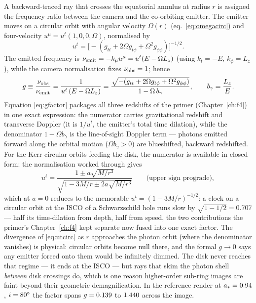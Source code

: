 A backward-traced ray that crosses the equatorial annulus at radius $r$
is assigned the frequency ratio between the camera and the co-orbiting
emitter. The emitter moves on a circular orbit with angular velocity
$\Omega(r)$ (eq.~\ref{eq:omegacirc}) and four-velocity
$u^\mu = u^t(1, 0, 0, \Omega)$, normalised by
\begin{equation}
u^t = \bigl[-(g_{tt} + 2\Omega g_{t\phi}
+ \Omega^2 g_{\phi\phi})\bigr]^{-1/2}.
\end{equation}
The emitted frequency is $\nu_{\rm emit} = -k_\mu u^\mu
= u^t (E - \Omega L_z)$ (using $k_t = -E$, $k_\phi = L_z$), while the
camera normalisation fixes $\nu_{\rm obs} = 1$; hence
\begin{equation}
g \equiv \frac{\nu_{\rm obs}}{\nu_{\rm emit}}
      = \frac{1}{u^t\,(E - \Omega L_z)}
      = \frac{\sqrt{-(g_{tt} + 2\Omega g_{t\phi} + \Omega^2
        g_{\phi\phi})}}{1 - \Omega\,b_\gamma},
\qquad b_\gamma = \frac{L_z}{E}.
\label{eq:gfactor}
\end{equation}
Equation \eqref{eq:gfactor} packages all three redshifts of the primer
(Chapter~\ref{ch:f4}) in one exact expression: the numerator carries
gravitational redshift and transverse Doppler (it is $1/u^t$, the
emitter's total time dilation), while the denominator
$1 - \Omega b_\gamma$ is the line-of-sight Doppler term — photons
emitted forward along the orbital motion ($\Omega b_\gamma > 0$) are
blueshifted, backward redshifted. For the Kerr circular orbits feeding
the disk, the numerator is available in closed form: the normalisation
worked through \citet{BardeenPressTeukolsky1972} gives
\begin{equation}
u^t =
\frac{1 \pm a\sqrt{M/r^3}}{\sqrt{1 - 3M/r \pm 2a\sqrt{M/r^3}}}
\qquad\text{(upper sign prograde)},
\label{eq:utcirc}
\end{equation}
which at $a = 0$ reduces to the memorable
$u^t = (1 - 3M/r)^{-1/2}$: a clock on a circular orbit at the ISCO of
a Schwarzschild hole runs slow by $\sqrt{1 - 1/2} = 0.707$ — half its
time-dilation from depth, half from speed, the two contributions the
primer's Chapter~\ref{ch:f4} kept separate now fused into one exact
factor. The divergence of \eqref{eq:utcirc} as $r$ approaches the
photon orbit (where the denominator vanishes) is physical: circular
orbits become null there, and the formal $g \to 0$ says any emitter
forced onto them would be infinitely dimmed. The disk never reaches
that regime — it ends at the ISCO — but rays that skim the photon
shell \emph{between} disk crossings do, which is one reason
higher-order sub-ring images are faint beyond their geometric
demagnification. In the reference render at
$a_* = 0.94$, $i = 80^\circ$ the factor spans $g = 0.139$ to
$1.440$ across the image.

